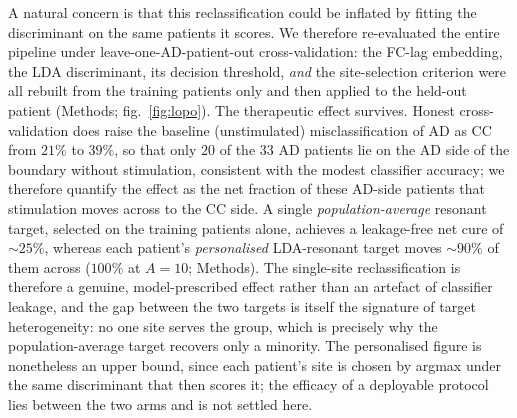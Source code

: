 \documentclass[11pt]{article}
\begin{document}
A natural concern is that this reclassification could be inflated by fitting the
discriminant on the same patients it scores. We therefore re-evaluated the entire
pipeline under leave-one-AD-patient-out cross-validation: the FC-lag embedding,
the LDA discriminant, its decision threshold, \emph{and} the site-selection
criterion were all rebuilt from the training patients only and then applied to the
held-out patient (Methods; fig.~\ref{fig:lopo}). The therapeutic effect
survives. Honest cross-validation does raise the baseline (unstimulated)
misclassification of AD as CC from $21\%$ to $39\%$, so that only $20$ of the $33$ AD patients lie on the AD side of the boundary without stimulation, consistent
with the modest classifier accuracy; we therefore quantify the effect as the net
fraction of these AD-side patients that stimulation moves across to the CC side. A single \emph{population-average} resonant target, selected on the training patients alone, achieves a leakage-free net cure of $\sim$$25\%$, whereas each patient's \emph{personalised} LDA-resonant target moves $\sim$$90\%$ of them across ($100\%$ at $A=10$; Methods). The single-site reclassification is therefore a genuine, model-prescribed effect rather than an artefact of classifier leakage, and the gap between the two targets is itself the signature of target heterogeneity: no one site serves the group, which is precisely why the population-average target recovers only a minority. The personalised figure is nonetheless an upper bound, since each patient's site is chosen by argmax under the same discriminant that then scores it; the efficacy of a deployable protocol lies between the two arms and is not settled here.
\end{document}

